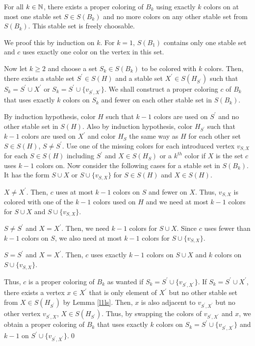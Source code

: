 \begin{thm}
For all $k\in\mathbb{N}$, there exists a proper coloring of $B_k$ using exactly $k$ colors on at most one stable set $S\in S(B_k)$ and no more colors on any other stable set from $S(B_k)$. This stable set is freely choosable.
\end{thm}
\begin{prf}
We proof this by induction on $k$. For $k=1$, $S(B_1)$ contains only one stable set and $c$ uses exactly one color on the vertex in this set. 

Now let $k\geq 2$ and choose a set $S_k\in S(B_k)$ to be colored with $k$ colors.  Then, there exists a stable set $S^\prime\in S(H)$ and a stable set $X^\prime\in S(H_{S^\prime})$ such that $S_k=S^\prime\cup X^\prime$ or $S_k=S^\prime\cup \{v_{S^\prime ,X^\prime}\}$. We shall construct a proper coloring $c$ of $B_k$ that uses exactly $k$ colors on $S_k$ and fewer on each other stable set in $S(B_k)$. 

By induction hypothesis, color $H$ such that $k-1$ colors are used on $S^\prime$ and no other stable set in $S(H)$. Also by induction hypothesis, color $H_{S^\prime}$ such that $k-1$ colors are used on $X^\prime$ and color $H_S$ the same way as $H$ for each other set $S\in S(H)$, $S\neq S^\prime$. Use one of the missing colors for each introduced vertex $v_{S,X}$ for each $S\in S(H)$ including $S^\prime$ and $X\in S(H_S)$ or a $k^{th}$ color if $X$ is the set $c$ uses $k-1$ colors on. Now consider the following cases for a stable set in $S(B_k)$. It has the form $S\cup X$ or $S\cup \{v_{S,X}\}$ for $S\in S(H)$ and $X\in S(H)$.
\newpage
\begin{case}
$X\neq X^\prime$. Then, $c$ uses at most $k-1$ colors on $S$ and fewer on $X$. Thus, $v_{S,X}$ is colored with one of the $k-1$ colors used on $H$ and we need at most $k-1$ colors for $S\cup X$ and $S\cup \{ v_{S,X}\}$.
\end{case}
\begin{case}
$S\neq S^\prime$ and $X= X^\prime$. Then, we need $k-1$ colors for $S\cup X$. Since $c$ uses fewer than $k-1$ colors on $S$, we also need at most $k-1$ colors for $S\cup \{ v_{S,X}\}$.
\end{case}
\begin{case}
$S=S^\prime$ and $X=X^\prime$. Then, $c$ uses exactly $k-1$ colors on $S\cup X$ and $k$ colors on $S\cup \{ v_{S,X}\}$.
\end{case}
Thus, $c$ is a proper coloring of $B_k$ as wanted if $S_k=S^\prime\cup \{v_{S^\prime ,X^\prime}\}$. If $S_k=S^\prime\cup X^\prime$, there exists a vertex $x\in X^\prime$ that is only element of $X^\prime$ but no other stable set from $X\in S(H_{S^\prime})$ by Lemma \ref{l1ls}. Then, $x$ is also adjacent to $v_{S^\prime, X^\prime}$ but no other vertex $v_{S^\prime, X}$, $X\in S(H_{S^\prime})$. Thus, by swapping the colors of $v_{S^\prime, X^\prime}$ and $x$, we obtain a proper coloring of $B_k$ that uses exactly $k$ colors on $S_k=S^\prime\cup \{v_{S^\prime ,X^\prime}\}$ and $k-1$ on $S^\prime\cup \{v_{S^\prime ,X^\prime}\}$.\qed
\end{prf}

